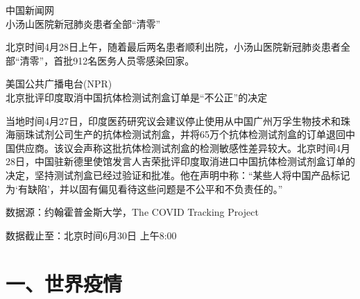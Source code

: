 \documentclass[
]{article}
\begin{document}
\vspace{-3mm}

\begin{center}
\textcolor{glaucous}{中国新闻网}\\小汤山医院新冠肺炎患者全部“清零”

\end{center}

北京时间4月28日上午，随着最后两名患者顺利出院，小汤山医院新冠肺炎患者全部``清零''，首批912名医务人员零感染回家。

\begin{center}
\textcolor{glaucous}{美国公共广播电台(NPR)}\\北京批评印度取消中国抗体检测试剂盒订单是“不公正”的决定
\end{center}

当地时间4月27日，印度医药研究议会建议停止使用从中国广州万孚生物技术和珠海丽珠试剂公司生产的抗体检测试剂盒，并将65万个抗体检测试剂盒的订单退回中国供应商。该议会声称这批抗体检测试剂盒的检测敏感性差异较大。北京时间4月28日，中国驻新德里使馆发言人吉荣批评印度取消进口中国抗体检测试剂盒订单的决定，坚持测试剂盒已经过验证和批准。他在声明中称：``某些人将中国产品标记为`有缺陷'，并以固有偏见看待这些问题是不公平和不负责任的。''

\vspace{5mm}

%
  \noindent{}%

\begin{Large}
\vspace{-7mm}
{数据源：约翰霍普金斯大学，The COVID Tracking  Project}
\end{Large}

\vspace{-7mm}

\begin{Large}
{数据截止至：北京时间6月30日 上午8:00}
\end{Large}

\vspace{-7mm}

\hypertarget{section-2}{%
\section{\texorpdfstring{\textcolor{glaucous}{\Huge 一、世界疫情}}{}}\label{section-2}}

\vspace{-5mm}
\end{document}
